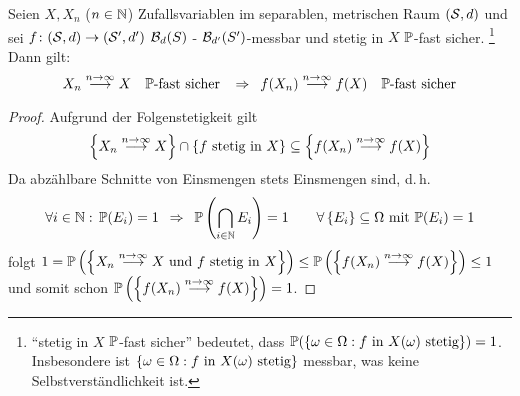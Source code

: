 \begin{satz} \label{satz: 3.8}
	Seien $X, X_n$ ($n \in \N$) Zufallsvariablen im separablen, metrischen Raum $(\S,d)$ und sei $f \colon (\S,d) \to (\S',d')$ $\B_d(S)$ - $\B_{d'}(S')$-messbar und stetig in $X$ $\P$-fast sicher.
	\footnote{\enquote{stetig in $X$ $\P$-fast sicher} bedeutet,
		dass $\P(\menge{\omega  \in  \Omega : f \text{ in } X(\omega) \text{ stetig}}) = 1$. Insbesondere ist $\menge{\omega  \in  \Omega : f \text{ in } X(\omega) \text{ stetig}}$ messbar, was keine Selbstverständlichkeit ist.}
	Dann gilt:
	\begin{equation*}
		X_n \ntoinf	X \quad \P\text{-fast sicher }
		\follows f(X_n) \ntoinf f(X) \quad \P\text{-fast sicher}
	\end{equation*}
\end{satz}

\begin{proof}
	Aufgrund der Folgenstetigkeit gilt
	\begin{equation*}
		\menge{X_n \ntoinf  X} \cap \menge{f \text{ stetig in }X}
		\subseteq
		\menge{f(X_n) \ntoinf f(X)}
	\end{equation*}
	Da abzählbare Schnitte von Einsmengen stets Einsmengen sind, d.\,h.
	\begin{equation*}
		\forall i \in \N : \, \P(E_i)=1
		\follows \P\brackets{\bigcap_{i \in \N} E_i}=1
		\qquad \forall \menge{E_i} \subseteq \Omega \mit \P(E_i)=1
	\end{equation*}
	folgt $1 = \P\brackets{\menge{X_n \ntoinf X \text{ und $f$ stetig in } X}} \le\P\brackets{\menge{f(X_n) \ntoinf  f(X)}} \le 1$ und somit schon $\P\brackets{\menge{f(X_n) \ntoinf  f(X)}} = 1$.
\end{proof}

